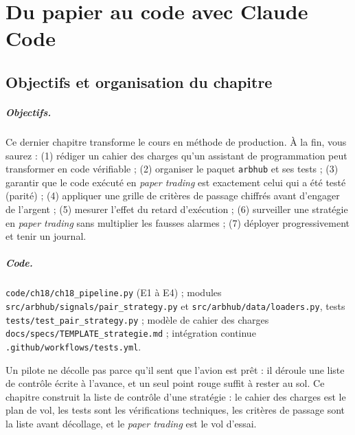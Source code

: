 \chapter{Du papier au code avec Claude Code}
\label{ch:18}

\section{Objectifs et organisation du chapitre}

\paragraph{Objectifs.} Ce dernier chapitre transforme le cours en méthode de production. À la fin, vous saurez : (1) rédiger un cahier des charges qu'un assistant de programmation peut transformer en code vérifiable ; (2) organiser le paquet \texttt{arbhub} et ses tests ; (3) garantir que le code exécuté en \emph{paper trading} est exactement celui qui a été testé (\og parité\fg) ; (4) appliquer une grille de critères de passage chiffrés avant d'engager de l'argent ; (5) mesurer l'effet du retard d'exécution ; (6) surveiller une stratégie en \emph{paper trading} sans multiplier les fausses alarmes ; (7) déployer progressivement et tenir un journal.

\paragraph{Code.}\sloppy \texttt{code/ch18/ch18\_pipeline.py} (E1 à E4) ; modules \texttt{src/arbhub/signals/pair\_strategy.py} et \texttt{src/arbhub/data/loaders.py}, tests \texttt{tests/test\_pair\_strategy.py} ; modèle de cahier des charges \texttt{docs/specs/TEMPLATE\_strategie.md} ; intégration continue \texttt{.github/workflows/tests.yml}.

\begin{intuition}
Un pilote ne décolle pas parce qu'il \og sent\fg{} que l'avion est prêt : il déroule une liste de contrôle écrite à l'avance, et un seul point rouge suffit à rester au sol. Ce chapitre construit la liste de contrôle d'une stratégie : le cahier des charges est le plan de vol, les tests sont les vérifications techniques, les critères de passage sont la liste avant décollage, et le \emph{paper trading} est le vol d'essai.
\end{intuition}


